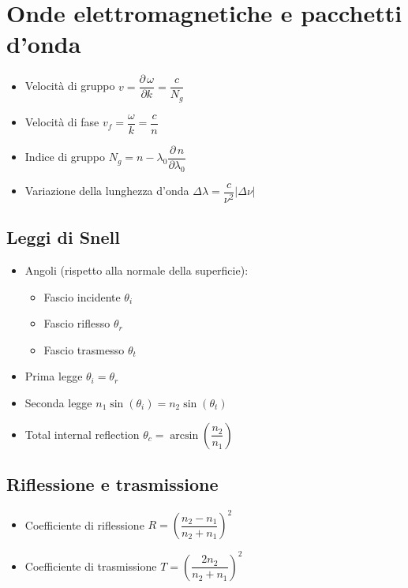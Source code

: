 \documentclass[9pt]{extarticle}
\begin{document}
\section{Onde elettromagnetiche e pacchetti d'onda}
\begin{itemize}
\item Velocità di gruppo \( v = \dfrac{\partial \, \omega}{\partial k} = \dfrac{c}{N_g} \)
\item Velocità di fase \( v_f = \dfrac{\omega}{k} = \dfrac{c}{n}  \)
\item Indice di gruppo \( N_g = n - \lambda_0 \dfrac{\partial \, n}{\partial \lambda_0} \)
\item Variazione della lunghezza d'onda \( \Delta \lambda = \dfrac{c}{\nu^2} | \Delta \nu | \)
\end {itemize}

\subsection{Leggi di Snell}
\begin{itemize}
  \item Angoli (rispetto alla normale della superficie):
        \begin{itemize}
          \item Fascio incidente \( \theta_i \)
          \item Fascio riflesso  \( \theta_r \)
          \item Fascio trasmesso \( \theta_t \)
        \end{itemize}
  \item Prima legge \( \theta_i = \theta_r \)
  \item Seconda legge \( n_1 \sin(\theta_i) = n_2 \sin(\theta_t) \)
  \item Total internal reflection \( \theta_c = \arcsin \left( \dfrac{n_2}{n_1} \right) \)
\end{itemize}

\subsection{Riflessione e trasmissione}
\begin{itemize}
  \item Coefficiente di riflessione \( R = \left( \dfrac{n_2 - n_1}{n_2 + n_1} \right) ^ 2 \)
  \item Coefficiente di trasmissione \( T = \left( \dfrac{2 n_2}{n_2 + n_1} \right) ^ 2 \)
\end{itemize}
\end{document}
